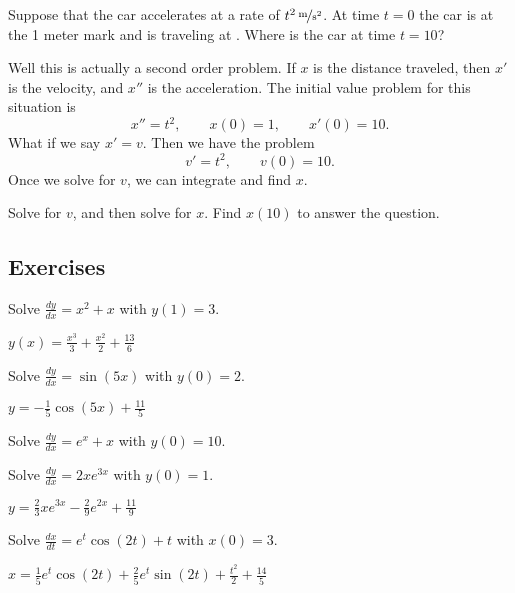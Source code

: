 \begin{example}
Suppose that the car accelerates at a rate of $\unitfrac[t^2]{m}{s^2}$.
At time $t=0$ the car is at the 1 meter mark and is traveling at
.  Where is the car at time $t=10$?
\end{example}
\begin{exampleSol}
Well this is actually a second order problem.  If $x$ is the distance
traveled, then $x'$ is the velocity, and $x''$ is the acceleration.
The initial value problem for this situation is
\begin{equation*}
x'' = t^2 , \qquad x(0) = 1 , \qquad x'(0) = 10 .
\end{equation*}
What if we say $x' = v$.  Then we have the problem
\begin{equation*}
v' = t^2, \qquad v(0) = 10 .
\end{equation*}
Once we solve for $v$, we can integrate and find $x$.
\end{exampleSol}

\begin{exercise}
Solve for $v$, and then solve for $x$.  Find $x(10)$ to answer the
question.
\end{exercise}

\subsection{Exercises}

\begin{exercise}
Solve $\frac{dy}{dx} = x^2+x$ with $y(1)=3$.
\end{exercise}
\comboSol{%
}
{%
$y(x) = \frac{x^3}{3} + \frac{x^2}{2} + \frac{13}{6}$
}

\begin{exercise}
Solve $\frac{dy}{dx} = \sin (5x)$ with $y(0)=2$.
\end{exercise}
\comboSol{%
}
{%
$y = -\frac{1}{5}\cos(5x) + \frac{11}{5}$
}

\begin{exercise}\ansMark%
Solve $\frac{dy}{dx} = e^x + x$ with $y(0) = 10$.
\end{exercise}

\begin{exercise}
Solve $\frac{dy}{dx} = 2xe^{3x}$ with $y(0) = 1$. 
\end{exercise}
\comboSol{%
}
{%
$y = \frac{2}{3}xe^{3x} - \frac{2}{9}e^{2x} + \frac{11}{9}$
}

\begin{exercise}
Solve $\frac{dx}{dt} = e^t\cos(2t) + t$ with $x(0) = 3$. 
\end{exercise}
\comboSol{%
}
{%
$x = \frac{1}{5}e^t\cos(2t) + \frac{2}{5}e^t\sin(2t) + \frac{t^2}{2} + \frac{14}{5}$
}

